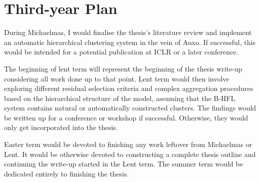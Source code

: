 \section{Third-year Plan}
During Michaelmas, I would finalise the thesis's literature review and implement an automatic hierarchical clustering system in the vein of Auxo. If successful, this would be intended for a potential publication at ICLR or a later conference.

The beginning of lent term will represent the beginning of the thesis write-up considering all work done up to that point. Lent term would then involve exploring different residual selection criteria and complex aggregation procedures based on the hierarchical structure of the model, assuming that the B-HFL system contains natural or automatically constructed clusters. The findings would be written up for a conference or workshop if successful. Otherwise, they would only get incorporated into the thesis.

Easter term would be devoted to finishing any work leftover from Michaelmas or Lent. It would be otherwise devoted to constructing a complete thesis outline and continuing the write-up started in the Lent term. The summer term would be dedicated entirely to finishing the thesis.


